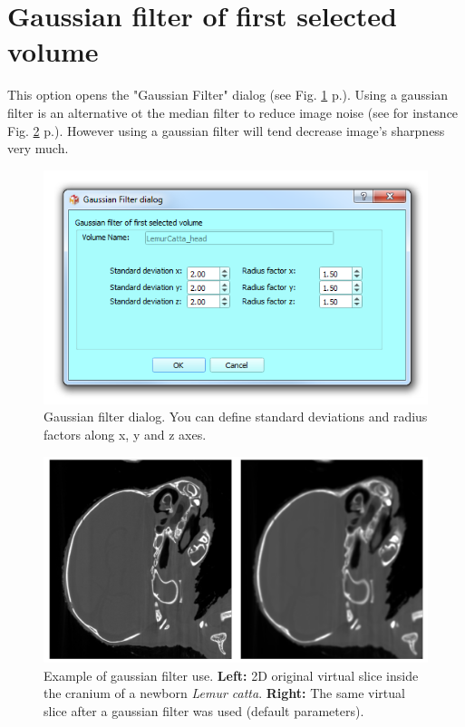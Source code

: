 \section{Gaussian filter of first selected volume}
This option opens the "Gaussian Filter" dialog (see Fig. \ref{gaussian_dialog} p.\pageref{gaussian_dialog}). Using a gaussian filter is an alternative ot the median filter to reduce image noise (see for instance Fig. \ref{gaussian_example} p.\pageref{median_example}). However using a gaussian filter will tend decrease image's sharpness very much.
 
\begin{figure}
  \centering
  \includegraphics[scale=0.5]{images/14/gaussian/gaussian_dialog.png}
\caption{Gaussian filter dialog. You can define standard deviations and radius factors along x, y and z axes.}	
\label{gaussian_dialog}
 \end{figure}


\begin{figure}
  \centering
  \includegraphics[scale=0.30]{images/14/gaussian/gaussian_example_default.png}
\caption{ Example of gaussian filter use. \textbf{Left:} 2D original virtual slice inside the cranium of a newborn \textit{Lemur catta}. \textbf{Right:} The same virtual slice after a gaussian filter was used (default parameters).}	
\label{gaussian_example}
 \end{figure}

